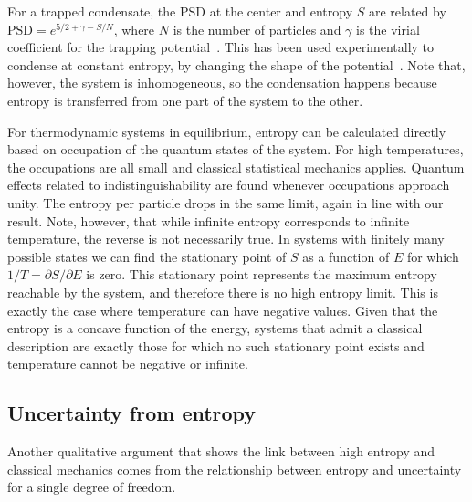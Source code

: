 \documentclass{article}
\begin{document}
For a trapped condensate, the PSD at the center and entropy $S$ are related by $\text{PSD}=e^{5/2+\gamma-S/N}$, where $N$ is the number of particles and $\gamma$ is the virial coefficient for the trapping potential~\cite{PhysRevLett.78.990}. This has been used experimentally to condense at constant entropy, by changing the shape of the potential~\cite{PhysRevLett.81.2194}. Note that, however, the system is inhomogeneous, so the condensation happens because entropy is transferred from one part of the system to the other.

For thermodynamic systems in equilibrium, entropy can be calculated directly based on occupation of the quantum states of the system. For high temperatures, the occupations are all small and classical statistical mechanics applies. Quantum effects related to indistinguishability are found whenever occupations approach unity. The entropy per particle drops in the same limit, again in line with our result. Note, however, that while infinite entropy corresponds to infinite temperature, the reverse is not necessarily true. In systems with finitely many possible states we can find the stationary point of $S$ as a function of $E$ for which $1/T=\partial S/\partial E$ is zero. This stationary point represents the maximum entropy reachable by the system, and therefore there is no high entropy limit. This is exactly the case where temperature can have negative values. Given that the entropy is a concave function of the energy, systems that admit a classical description are exactly those for which no such stationary point exists and temperature cannot be negative or infinite.%

\subsection{Uncertainty from entropy}

Another qualitative argument that shows the link between high entropy and classical mechanics comes from the relationship between entropy and uncertainty for a single degree of freedom.
\end{document}
